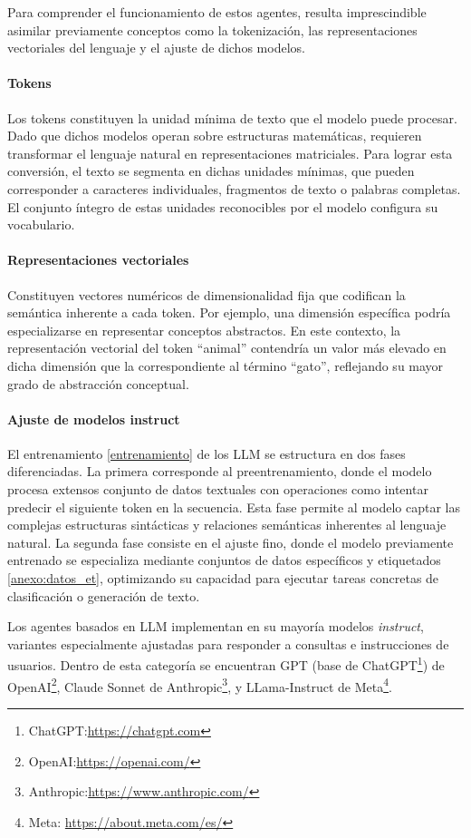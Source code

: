 Para comprender el funcionamiento de estos agentes, resulta imprescindible asimilar previamente conceptos como la tokenización, las representaciones vectoriales del lenguaje y el ajuste de dichos modelos.

\paragraph{Tokens}\label{token}
Los tokens constituyen la unidad mínima de texto que el modelo puede procesar. Dado que dichos modelos operan sobre estructuras matemáticas, requieren transformar el lenguaje natural en representaciones matriciales. Para lograr esta conversión, el texto se segmenta en dichas unidades mínimas, que pueden corresponder a caracteres individuales, fragmentos de texto o palabras completas. El conjunto íntegro de estas unidades reconocibles por el modelo configura su vocabulario. 

\paragraph{Representaciones vectoriales}
Constituyen vectores numéricos de dimensionalidad fija que codifican la semántica inherente a cada token. Por ejemplo, una dimensión específica podría especializarse en representar conceptos abstractos. En este contexto, la representación vectorial del token ``animal'' contendría un valor más elevado en dicha dimensión que la correspondiente al término ``gato'', reflejando su mayor grado de abstracción conceptual.

\paragraph{Ajuste de modelos instruct}
El entrenamiento \ref{entrenamiento} de los LLM se estructura en dos fases diferenciadas. La primera corresponde al preentrenamiento, donde el modelo procesa extensos conjunto de datos textuales con operaciones como intentar predecir el siguiente token en la secuencia. Esta fase permite al modelo captar las complejas estructuras sintácticas y relaciones semánticas inherentes al lenguaje natural. La segunda fase consiste en el ajuste fino, donde el modelo previamente entrenado se especializa mediante conjuntos de datos específicos y etiquetados \ref{anexo:datos_et}, optimizando su capacidad para ejecutar tareas concretas de clasificación o generación de texto.

Los agentes basados en LLM implementan en su mayoría modelos \textit{instruct}, variantes especialmente ajustadas para responder a consultas e instrucciones de usuarios. Dentro de esta categoría se encuentran GPT (base de ChatGPT\footnote{ChatGPT:\url{https://chatgpt.com}}) de OpenAI\footnote{OpenAI:\url{https://openai.com/}}, Claude Sonnet de Anthropic\footnote{Anthropic:\url{https://www.anthropic.com/}}, y LLama-Instruct de Meta\footnote{Meta: \url{https://about.meta.com/es/}}.




